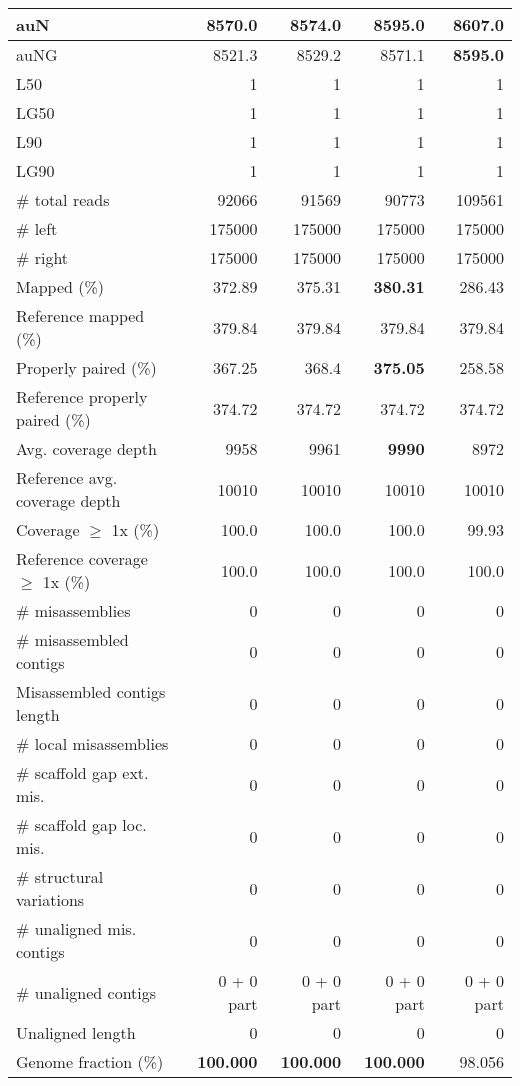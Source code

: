 \documentclass[12pt,a4paper]{article}
\begin{document}
\begin{table}[ht]
\begin{center}
\begin{tabular}{|l*{4}{|r}|}
auN & 8570.0 & 8574.0 & 8595.0 & {\bf 8607.0} \\ \hline
auNG & 8521.3 & 8529.2 & 8571.1 & {\bf 8595.0} \\ \hline
L50 & 1 & 1 & 1 & 1 \\ \hline
LG50 & 1 & 1 & 1 & 1 \\ \hline
L90 & 1 & 1 & 1 & 1 \\ \hline
LG90 & 1 & 1 & 1 & 1 \\ \hline
\# total reads & 92066 & 91569 & 90773 & 109561 \\ \hline
\# left & 175000 & 175000 & 175000 & 175000 \\ \hline
\# right & 175000 & 175000 & 175000 & 175000 \\ \hline
Mapped (\%) & 372.89 & 375.31 & {\bf 380.31} & 286.43 \\ \hline
Reference mapped (\%) & 379.84 & 379.84 & 379.84 & 379.84 \\ \hline
Properly paired (\%) & 367.25 & 368.4 & {\bf 375.05} & 258.58 \\ \hline
Reference properly paired (\%) & 374.72 & 374.72 & 374.72 & 374.72 \\ \hline
Avg. coverage depth & 9958 & 9961 & {\bf 9990} & 8972 \\ \hline
Reference avg. coverage depth & 10010 & 10010 & 10010 & 10010 \\ \hline
Coverage $\geq$ 1x (\%) & 100.0 & 100.0 & 100.0 & 99.93 \\ \hline
Reference coverage $\geq$ 1x (\%) & 100.0 & 100.0 & 100.0 & 100.0 \\ \hline
\# misassemblies & 0 & 0 & 0 & 0 \\ \hline
\# misassembled contigs & 0 & 0 & 0 & 0 \\ \hline
Misassembled contigs length & 0 & 0 & 0 & 0 \\ \hline
\# local misassemblies & 0 & 0 & 0 & 0 \\ \hline
\# scaffold gap ext. mis. & 0 & 0 & 0 & 0 \\ \hline
\# scaffold gap loc. mis. & 0 & 0 & 0 & 0 \\ \hline
\# structural variations & 0 & 0 & 0 & 0 \\ \hline
\# unaligned mis. contigs & 0 & 0 & 0 & 0 \\ \hline
\# unaligned contigs & 0 + 0 part & 0 + 0 part & 0 + 0 part & 0 + 0 part \\ \hline
Unaligned length & 0 & 0 & 0 & 0 \\ \hline
Genome fraction (\%) & {\bf 100.000} & {\bf 100.000} & {\bf 100.000} & 98.056 \\ \hline

\end{tabular}
\end{center}
\end{table}
\end{document}
